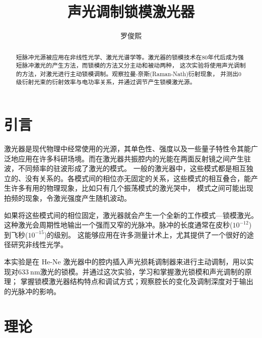 \documentclass[font=default]{mpltx}
\begin{document}
\title{声光调制锁模激光器} %
\author{罗俊熙} %
\date{}
\begin{abstract}
	短脉冲光源被应用在非线性光学、激光光谱学等。激光器的锁模技术在80年代后成为强短脉冲激光的产生方法，而锁模的方法又分主动和被动两种，
    这次实验将使用声光调制的方法，对激光进行主动锁模调制。观察拉曼-奈斯(Raman-Nath)衍射现象，
    并测出0级衍射光束的衍射效率与电功率关系，并通过调节产生锁模激光源。
\end{abstract}

\maketitle

\section{引言}
激光器是现代物理中经常使用的光源，其单色性、强度以及一些量子特性令其能广泛地应用在许多科研场境。而在激光器共振腔内的光能在两面反射镜之间产生驻波，不同频率的驻波形成了激光的模式。
一般的激光器中，这些模式都是相互独立的、没有关系的。各模式间的相位亦无固定的关系，这些模式的相互叠合，能产生许多有用的物理现象，比如只有几个振荡模式的激光哭中，
模式之间可能出现拍频的现象，令激光强度产生随机波动。\par

如果将这些模式间的相位固定，激光器就会产生一个全新的工作模式—锁模激光。这种激光会周期性地输出一个强而又窄的光脉冲。脉冲的长度通常在皮秒($10^{-12}$)到飞秒($10^{-15}$)的级别。
这能够应用在许多测量计术上，尤其提供了一个很好的途径研究非线性光学。\par

本实验是在 He-Ne 激光器中的腔内插入声光损耗调制器来进行主动调制，用以实现对$\qty{633}{\nm}$激光的锁模。并通过这次实验，学习和掌握激光锁模和声光调制的原理；
掌握锁模激光器结构特点和调试方式；观察腔长的变化及调制深度对于输出的光脉冲的影响。

\section{理论}\label{sec:theory}
\end{document}
